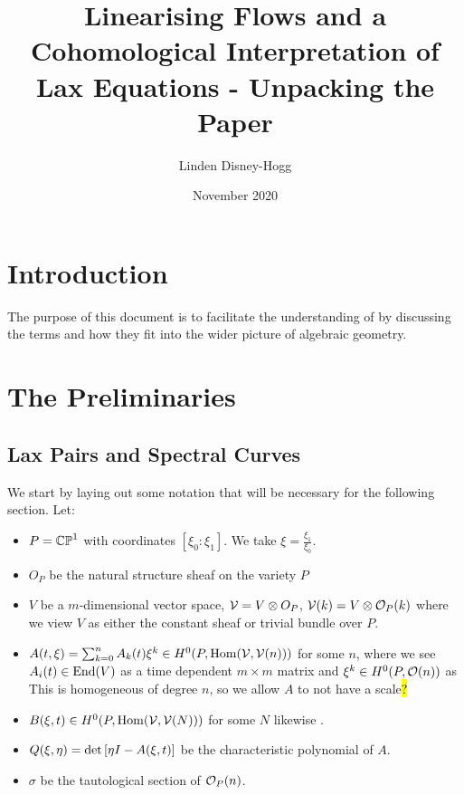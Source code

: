 \documentclass{article}
\title{Linearising Flows and a Cohomological Interpretation of Lax Equations - Unpacking the Paper}
\author{Linden Disney-Hogg}
\date{November 2020}
\begin{document}
\maketitle
\tableofcontents

\section{Introduction}
The purpose of this document is to facilitate the understanding of \cite{Griffiths1985} by discussing the terms and how they fit into the wider picture of algebraic geometry. 
\section{The Preliminaries}

\subsection{Lax Pairs and Spectral Curves}
\begin{notation}
	We start by laying out some notation that will be necessary for the following section. Let:
	\begin{itemize}
		\item $P=\mathbb{CP}^1$ with coordinates $[\xi_0:\xi_1]$. We take $\xi = \frac{\xi_1}{\xi_0}$. 
		\item $O_P$ be the natural structure sheaf on the variety $P$
		\item $V$ be a $m$-dimensional vector space, $\mathcal{V} = V \otimes O_P$, $\mathcal{V}(k) = V \otimes \mathcal{O}_P(k)$ where we view $V$ as either the constant sheaf or trivial bundle over $P$.
		\item $A(t,\xi) = \sum_{k=0}^n A_k(t) \xi^k \in  H^0(P,\operatorname{Hom}(\mathcal{V},\mathcal{V}(n)))$ for some $n$, where we see $A_i(t) \in \operatorname{End}(V)$ as a time dependent $m\times m$ matrix and $\xi^k \in H^0(P,\mathcal{O}(n))$ as
This is homogeneous of degree $n$, so we allow $A$ to not have a scale\hl{?}
        \item $B(\xi,t) \in  H^0(P,\operatorname{Hom}(\mathcal{V},\mathcal{V}(N)))$ for some $N$ likewise . 
        \item $Q(\xi,\eta) = \det\left[ \eta I - A(\xi,t) \right]$ be the characteristic polynomial of $A$.
        \item $\sigma$ be the tautological section of $\mathcal{O}_P(n)$.  
	\end{itemize}
\end{notation}
\end{document}
